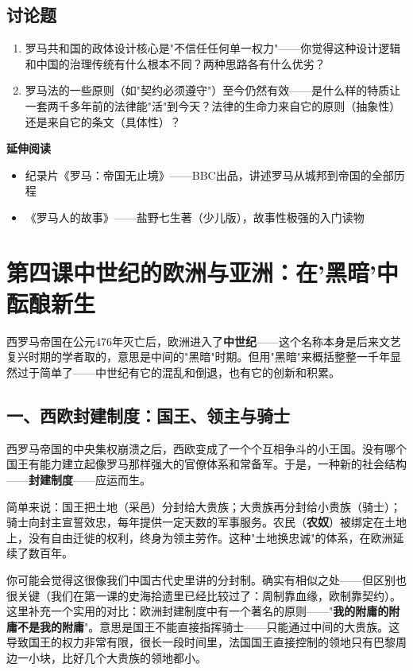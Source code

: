 \documentclass[a4paper,12pt]{ctexart}
\begin{document}
\subsection*{讨论题}
\begin{enumerate}
  \item 罗马共和国的政体设计核心是"不信任任何单一权力"——你觉得这种设计逻辑和中国的治理传统有什么根本不同？两种思路各有什么优劣？
  \item 罗马法的一些原则（如"契约必须遵守"）至今仍然有效——是什么样的特质让一套两千多年前的法律能"活"到今天？法律的生命力来自它的原则（抽象性）还是来自它的条文（具体性）？
\end{enumerate}

\vspace{0.3cm}
\textcolor{blue!70!black}{\textbf{延伸阅读}}
\begin{itemize}
  \item 纪录片《罗马：帝国无止境》——BBC出品，讲述罗马从城邦到帝国的全部历程
  \item 《罗马人的故事》——盐野七生著（少儿版），故事性极强的入门读物
\end{itemize}

\newpage

\section{\textcolor{orange!80!black}{第四课\quad 中世纪的欧洲与亚洲：在'黑暗'中酝酿新生}}

西罗马帝国在公元476年灭亡后，欧洲进入了\textbf{中世纪}——这个名称本身是后来文艺复兴时期的学者取的，意思是中间的"黑暗"时期。但用"黑暗"来概括整整一千年显然过于简单了——中世纪有它的混乱和倒退，也有它的创新和积累。

\subsection*{一、西欧封建制度：国王、领主与骑士}

西罗马帝国的中央集权崩溃之后，西欧变成了一个个互相争斗的小王国。没有哪个国王有能力建立起像罗马那样强大的官僚体系和常备军。于是，一种新的社会结构——\textbf{封建制度}——应运而生。

简单来说：国王把土地（采邑）分封给大贵族；大贵族再分封给小贵族（骑士）；骑士向封主宣誓效忠，每年提供一定天数的军事服务。农民（\textbf{农奴}）被绑定在土地上，没有自由迁徙的权利，终身为领主劳作。这种"土地换忠诚"的体系，在欧洲延续了数百年。

你可能会觉得这很像我们中国古代史里讲的分封制。确实有相似之处——但区别也很关键（我们在第一课的史海拾遗里已经比较过了：周制靠血缘，欧制靠契约）。这里补充一个实用的对比：欧洲封建制度中有一个著名的原则——"\textbf{我的附庸的附庸不是我的附庸}"。意思是国王不能直接指挥骑士——只能通过中间的大贵族。这导致国王的权力非常有限，很长一段时间里，法国国王直接控制的领地只有巴黎周边一小块，比好几个大贵族的领地都小。
\end{document}
